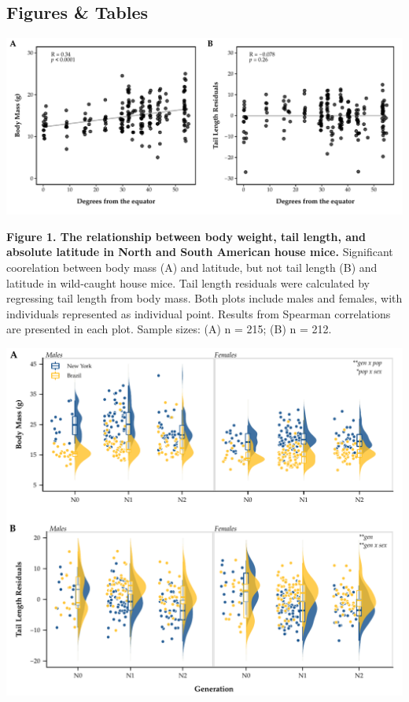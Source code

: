 \documentclass[]{article}
\begin{document}
\newpage

\hypertarget{figures-tables}{%
\subsection{Figures \& Tables}\label{figures-tables}}

\includegraphics{../figures/Nachman_transects.pdf}

\textbf{Figure 1. The relationship between body weight, tail length, and
absolute latitude in North and South American house mice.} Significant
coorelation between body mass (A) and latitude, but not tail length (B)
and latitude in wild-caught house mice. Tail length residuals were
calculated by regressing tail length from body mass. Both plots include
males and females, with individuals represented as individual point.
Results from Spearman correlations are presented in each plot. Sample
sizes: (A) n = 215; (B) n = 212.

\newpage

\includegraphics{../figures/generation_phenotypes.pdf}
\end{document}
